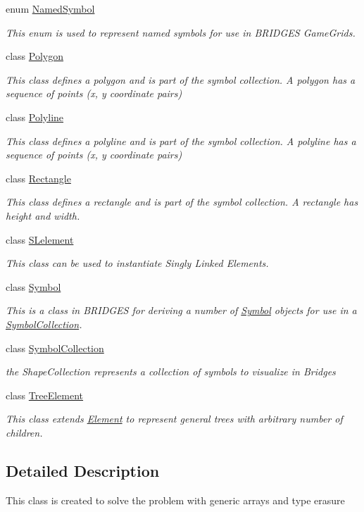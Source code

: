 \begin{DoxyCompactItemize}
enum \hyperlink{enumbridges_1_1base_1_1_named_symbol}{Named\+Symbol}
\begin{DoxyCompactList}\small\item\em This enum is used to represent named symbols for use in B\+R\+I\+D\+G\+ES Game\+Grids. \end{DoxyCompactList}\item 
class \hyperlink{classbridges_1_1base_1_1_polygon}{Polygon}
\begin{DoxyCompactList}\small\item\em This class defines a polygon and is part of the symbol collection. A polygon has a sequence of points (x, y coordinate pairs) \end{DoxyCompactList}\item 
class \hyperlink{classbridges_1_1base_1_1_polyline}{Polyline}
\begin{DoxyCompactList}\small\item\em This class defines a polyline and is part of the symbol collection. A polyline has a sequence of points (x, y coordinate pairs) \end{DoxyCompactList}\item 
class \hyperlink{classbridges_1_1base_1_1_rectangle}{Rectangle}
\begin{DoxyCompactList}\small\item\em This class defines a rectangle and is part of the symbol collection. A rectangle has height and width. \end{DoxyCompactList}\item 
class \hyperlink{classbridges_1_1base_1_1_s_lelement}{S\+Lelement}
\begin{DoxyCompactList}\small\item\em This class can be used to instantiate Singly Linked Elements. \end{DoxyCompactList}\item 
class \hyperlink{classbridges_1_1base_1_1_symbol}{Symbol}
\begin{DoxyCompactList}\small\item\em This is a class in B\+R\+I\+D\+G\+ES for deriving a number of \hyperlink{classbridges_1_1base_1_1_symbol}{Symbol} objects for use in a \hyperlink{classbridges_1_1base_1_1_symbol_collection}{Symbol\+Collection}. \end{DoxyCompactList}\item 
class \hyperlink{classbridges_1_1base_1_1_symbol_collection}{Symbol\+Collection}
\begin{DoxyCompactList}\small\item\em the Shape\+Collection represents a collection of symbols to visualize in Bridges \end{DoxyCompactList}\item 
class \hyperlink{classbridges_1_1base_1_1_tree_element}{Tree\+Element}
\begin{DoxyCompactList}\small\item\em This class extends \hyperlink{classbridges_1_1base_1_1_element}{Element} to represent general trees with arbitrary number of children. \end{DoxyCompactList}\end{DoxyCompactItemize}


\subsection{Detailed Description}
This class is created to solve the problem with generic arrays and type erasure 